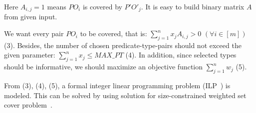 \documentclass{acm_proc_article-sp}
\begin{document}
Here $A_{i,j} = 1$ means $PO_{i}$ is covered by $P'O'_{j}$. It is easy to build binary matrix $A$ from given input.

We want every pair $PO_{i}$ to be covered, that is: $\sum_{j=1}^{n}{x_{j} A_{i,j}} > 0$ $(\forall i \in [m])$ (3). Besides, the number of chosen predicate-type-pairs should not exceed the given parameter: $\sum_{j=1}^{n}{x_{j}} \leq MAX\_PT$ (4). In addition, since selected types should be informative, we should maximize an objective function $\sum_{j=1}^{n}{w_{j}}$ (5).

From (3), (4), (5), a formal integer linear programming problem (ILP~\cite{ref1}) is modeled. This can be solved by using solution for size-constrained weighted set cover problem~\cite{ref3}.



\end{document}
